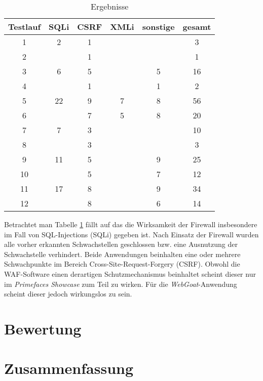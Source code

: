 \begin{table}[h]
    \centering
    \begin{tabular}{cccccc} 
      \toprule
    \textbf{Testlauf} & \textbf{SQLi} & \textbf{CSRF} & \textbf{XMLi} & \textbf{sonstige} & \textbf{gesamt} \\ 
     \midrule
     1 & 2 & 1 &  &  & 3\\
     2 &   & 1 &  &  & 1\\
     3 & 6 & 5 &  & 5 & 16\\
     4 &   & 1 &  & 1  & 2 \\
     5 & 22 & 9 & 7 & 8& 56\\
     6 &  & 7 & 5 & 8 & 20 \\
     7 & 7 & 3 &  &  &  10  \\ 
    8 &  & 3 &  & & 3  \\
    9 & 11 & 5 &  & 9 & 25 \\ 
    10 &   & 5 &  & 7  & 12 \\
    11 & 17 & 8 &  & 9 & 34  \\ 
    12 &  & 8 &  & 6 & 14 \\
   \bottomrule
    \end{tabular}
    \caption{Ergebnisse}
    \label{tab:tes2tergebnisse}
\end{table}

Betrachtet man Tabelle \ref{tab:tes2tergebnisse} fällt auf das die Wirksamkeit der Firewall insbesondere im Fall von SQL-Injections (SQLi) gegeben ist. Nach Einsatz der Firewall wurden alle vorher erkannten Schwachstellen geschlossen bzw. eine Ausnutzung der Schwachstelle verhindert. Beide Anwendungen beinhalten eine oder mehrere Schwachpunkte im Bereich Cross-Site-Request-Forgery (CSRF). Obwohl die WAF-Software einen derartigen Schutzmechanismus beinhaltet scheint dieser nur im \emph{Primefaces Showcase} zum Teil zu wirken. Für die \emph{WebGoat}-Anwendung scheint dieser jedoch wirkungslos zu sein.


\section{Bewertung}








\section{Zusammenfassung}


